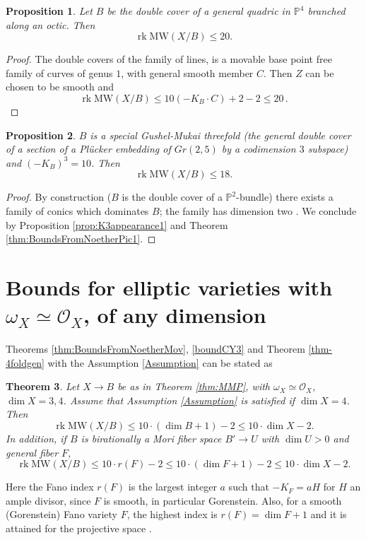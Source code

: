 \documentclass[11pt]{amsart}
\newtheorem{theorem}{Theorem}[section]
\newtheorem{proposition}[theorem]{Proposition}
\theoremstyle{definition}
\theoremstyle{definition}
\theoremstyle{remark}
\theoremstyle{remark}
\theoremstyle{definition}
\theoremstyle{conjecture}
\newcommand{\MW}{\mathrm{MW}}
\begin{document}
\begin{proposition}
 Let $B$ be the double cover of a \textit{ general} quadric in $\mathbb{P}^4$ branched along an octic. Then  
\[\operatorname{rk} \MW(X/B)  \leq 20 .\]
\end{proposition}
\begin{proof} The double covers of the family of lines, is a movable base point free family of curves of genus $1$, with general smooth member $C$.    Then $Z$ can be chosen to be smooth  and 
$$\operatorname{rk} \MW(X/B)  \leq  10(-K_B \cdot C ) +2-2 \leq 20 \,.$$ \end{proof}

 \begin{proposition}
    $B$ is   a special Gushel-Mukai threefold (the general double cover of a section of  a Plücker embedding of $Gr(2,5)$ by a codimension $3$ subspace) and $(-K_B)^3=10$. Then
    \[
	\operatorname{rk} \MW(X/B)  \leq  18.
	\]
\end{proposition}
   
\begin{proof}  By construction ($B$ is the double cover of a $\mathbb{P}^2$-bundle) there exists a  family of conics which dominates $B$; the family has dimension two  \cite[Theorem 7.3, Remark 7.4]{debarre2024quadricsgushelmukaivarieties}. We conclude by  Proposition \ref{prop:K3appearance1} and Theorem \ref{thm:BoundsFromNoetherPic1}.\end{proof}




\section{Bounds for elliptic varieties with $\omega_X \simeq \mathcal{O}_X$, 
of any dimension}
 Theorems \ref{thm:BoundsFromNoetherMov}, \ref{boundCY3} and Theorem \ref{thm-4foldgen}  with the Assumption \ref{Assumption} can be stated as
 \begin{theorem}\label{thm:boundsCY3and4Combined} Let  $ X \to B$ be as in Theorem \ref{thm:MMP}, with $\omega_X \simeq \mathcal{O}_X$, 
 $\dim X=3,4$.   Assume that Assumption \ref{Assumption} is satisfied if $\dim X=4$. Then
  \[\operatorname{rk} \MW(X/B) \leq  10 \cdot (\dim B +1) -2 \leq 10 \cdot  \dim X -2.\] 
In addition, if $B$ is birationally    a  Mori fiber space  $B' \to U$ with $\dim U >0$  and 
general      fiber  $F$, 
\[\operatorname{rk} \MW(X/B) \leq 10 \cdot  r(F)-2  \leq 10 \cdot (\dim F +1) -2 \leq 10 \cdot  \dim X -2.\]
 \end{theorem}
Here the Fano index $r(F)$ is the largest integer $a$ such that $-K_F = a H$ for $H$ an ample divisor, since $F$ is smooth, in particular Gorenstein. 
Also, for a smooth (Gorenstein) Fano variety $F$, the highest index is $r(F)=\dim F+1$ and it is attained for the projective space \cite{KobayashiOchiai1973}. \\
\end{document}
